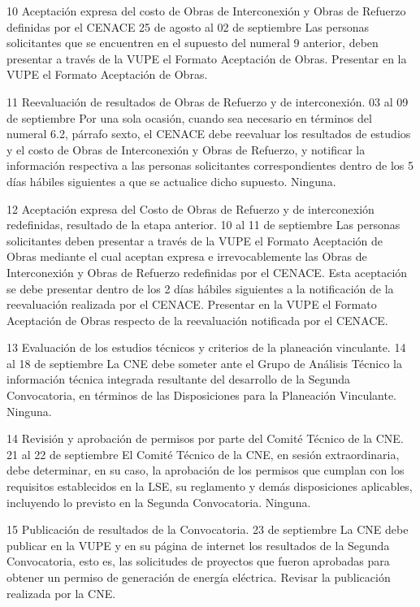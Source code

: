  10
 Aceptación expresa del costo de Obras de Interconexión y Obras de Refuerzo definidas por el CENACE
 25 de agosto al 02 de septiembre
 Las personas solicitantes que se encuentren en el supuesto del numeral 9 anterior, deben presentar a través de la VUPE el Formato Aceptación de Obras.
 Presentar en la VUPE el Formato Aceptación de Obras.
 
 11
 Reevaluación de resultados de Obras de Refuerzo y de interconexión.
 03 al 09 de septiembre
 Por una sola ocasión, cuando sea necesario en términos del numeral 6.2, párrafo sexto, el CENACE debe reevaluar los resultados de estudios y el costo de Obras de Interconexión y Obras de Refuerzo, y notificar la información respectiva a las personas solicitantes correspondientes dentro de los 5 días hábiles siguientes a que se actualice dicho supuesto.
 Ninguna.
 
 12
 Aceptación expresa del Costo de Obras de Refuerzo y de interconexión redefinidas, resultado de la etapa anterior.
 10 al 11 de septiembre
 Las personas solicitantes deben presentar a través de la VUPE el Formato Aceptación de Obras mediante el cual aceptan expresa e irrevocablemente las Obras de Interconexión y Obras de Refuerzo redefinidas por el CENACE. Esta aceptación se debe presentar dentro de los 2 días hábiles siguientes a la notificación de la reevaluación realizada por el CENACE.
 Presentar en la VUPE el Formato Aceptación de Obras respecto de la reevaluación notificada por el CENACE.
 
 13
 Evaluación de los estudios técnicos y criterios de la planeación vinculante.
 14 al 18 de septiembre
 La CNE debe someter ante el Grupo de Análisis Técnico la información técnica integrada resultante del desarrollo de la Segunda Convocatoria, en términos de las Disposiciones para la Planeación Vinculante.
 Ninguna.
 
 14
 Revisión y aprobación de permisos por parte del Comité Técnico de la CNE.
 21 al 22 de septiembre
 El Comité Técnico de la CNE, en sesión extraordinaria, debe determinar, en su caso, la aprobación de los permisos que cumplan con los requisitos establecidos en la LSE, su reglamento y demás disposiciones aplicables, incluyendo lo previsto en la Segunda Convocatoria.
 Ninguna.
 
 15
 Publicación de resultados de la Convocatoria.
 23 de septiembre
 La CNE debe publicar en la VUPE y en su página de internet los resultados de la Segunda Convocatoria, esto es, las solicitudes de proyectos que fueron aprobadas para obtener un permiso de generación de energía eléctrica.
 Revisar la publicación realizada por la CNE.
 
